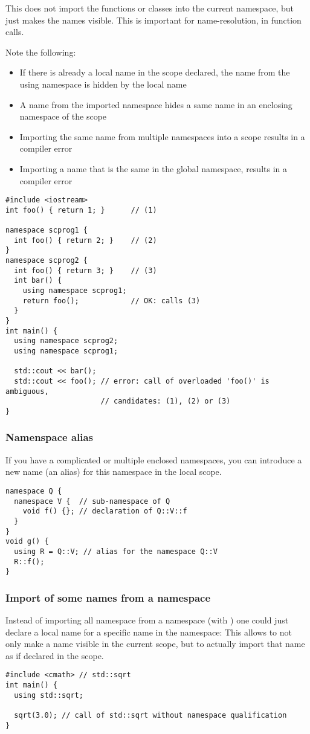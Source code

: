 This does not import the functions or classes into the current namespace, but just makes the names visible. This is important for name-resolution, \eg
in function calls.

Note the following:
\begin{itemize}
\item If there is already a local name in the scope declared, the name from the using namespace is hidden by the local name
\item A name from the imported namespace hides a same name in an enclosing namespace of the scope
\item Importing the same name from multiple namespaces into a scope results in a compiler error
\item Importing a name that is the same in the global namespace, results in a compiler error
\end{itemize}

\begin{verbatim}
#include <iostream>
int foo() { return 1; }      // (1)

namespace scprog1 {
  int foo() { return 2; }    // (2)
}
namespace scprog2 {
  int foo() { return 3; }    // (3)
  int bar() {
    using namespace scprog1;
    return foo();            // OK: calls (3)
  }
}
int main() {
  using namespace scprog2;
  using namespace scprog1;

  std::cout << bar();
  std::cout << foo(); // error: call of overloaded 'foo()' is ambiguous,
                      // candidates: (1), (2) or (3)
}
\end{verbatim}

\subsubsection{Namenspace alias}
If you have a complicated or multiple enclosed namespaces, you can introduce a new name (an alias) for this namespace in the local scope.
%
\begin{verbatim}
namespace Q {
  namespace V {  // sub-namespace of Q
    void f() {}; // declaration of Q::V::f
  }
}
void g() {
  using R = Q::V; // alias for the namespace Q::V
  R::f();
}
\end{verbatim}

\subsubsection{Import of some names from a namespace}
Instead of importing all namespace from a namespace (with ) one could just declare a local name for a specific name in the namespace:
This allows to not only make a name visible in the current scope, but to actually import that name as if declared in the scope.
%
\begin{verbatim}
#include <cmath> // std::sqrt
int main() {
  using std::sqrt;

  sqrt(3.0); // call of std::sqrt without namespace qualification
}
\end{verbatim}

